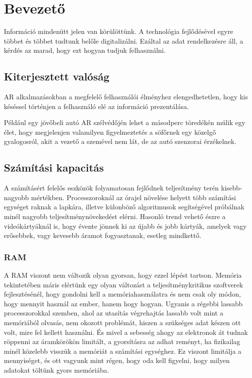
\section{Bevezet\H o}
Inform\'aci\'o minden\"utt jelen van k\"or\"ul\"ott\"unk. A technol\'ogia fejl\H od\'es\'evel egyre t\"obbet \'es t\"obbet tudtunk bel\H ole digitaliz\'alni. Ez\'altal az adat rendelkez\'esre \'all, a k\'erd\'es az marad, hogy ezt hogyan tudjuk felhaszn\'alni.

\subsection{Kiterjesztett val\'os\'ag}
AR alkalmaz\'asokban a megfelel\H o felhaszn\'al\'oi \'elm\'enyhez elengedhetetlen, hogy kis k\'es\'essel t\"ort\'enjen a felhaszn\'al\'o el\'e az inform\'aci\'o prezent\'al\'asa. 

P\'eld\'aul egy j\"ov\H obeli aut\'o AR sz\'elv\'ed\H oj\'en lehet a m\'asodperc t\"ored\'ek\'en m\'ulik egy \'elet, hogy megjelenjen valamilyen figyelmeztet\'es a s\"of\H ornek egy k\"ozelg\H o gyalogosr\'ol, akit a vezet\H o a szem\'evel nem l\'at, de az aut\'o szenzorai \'erz\'ekelnek.


\subsection{Sz\'am\'it\'asi kapacit\'as}
A sz\'am\'it\'as\'ert felel\H os eszk\"oz\"ok folyamatosan fejl\H odnek teljes\'itm\'eny ter\'en kisebb-nagyobb m\'ert\'ekben. Processzorokn\'al az \'orajel n\"ovel\'ese helyett t\"obb sz\'am\'it\'asi egys\'eget raknak a lapk\'ara, illetve k\"ulonb\"oz\H o algoritmusok seg\'its\'eg\'evel pr\'ob\'alnak min\'el nagyobb teljes\'itm\'enyn\"oveked\'est el\'erni.
Hasonl\'o trend vehet\H o \'eszre a vide\'ok\'arty\'akn\'al is, hogy \'evente j\"onnek ki az \'ujabb \'es jobb k\'arty\'ak, amelyek vagy er\H osebbek, vagy kevesebb \'aramot fogyasztanak, esetleg mindkett\H o.

\subsubsection{RAM}\label{ramspeed}
A RAM viszont nem v\'altozik olyan gyorsan, hogy ezzel l\'ep\'est tartson. 
Mem\'oria tekintet\'eben m\'aris el\'ert\"unk egy olyan v\'altoz\'ast a teljes\'itm\'enykritikus szoftverek fejleszt\'es\'en\'el, hogy gondolni kell a mem\'oriahaszn\'alatra \'es nem csak oly m\'odon, hogy mennyit haszn\'al az ember, hanem hogy hogyan.
Ugyanis a r\'egebbi lassabb processzorokkal szemben, ahol az utas\'it\'as v\'egrehajt\'as lassabb volt mint a mem\'ori\'ab\'ol olvas\'as, nem okozott probl\'em\'at, hiszen a sz\"uks\'eges adat k\'eszen ott volt, mire fel kellett haszn\'alni.
\'Es mivel  a sebess\'eg ahogy az elektronok \'at tudnak r\"oppenni az \'aramk\"or\"ok\"on limit\'alt, a gyors\'it\'asra az adhat rem\'enyt, ha fizikailag min\'el k\"ozelebb vissz\"uk a mem\'ori\'at a sz\'am\'it\'asi egys\'eghez. Ez viszont limit\'alja a mennyis\'eget, \'es ott vagyunk mint r\'egen, hogy oda kell figyelni, hogy milyen adatokat t\"olt\"unk gyors mem\'ori\'aba.

